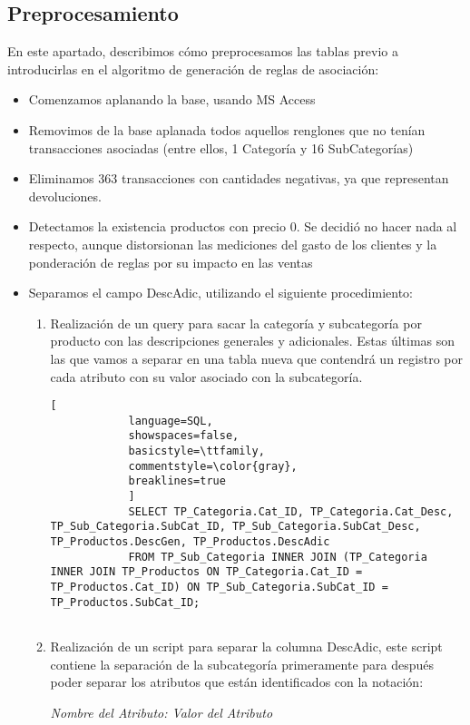 \documentclass[]{article}
\begin{document}
	\subsection{Preprocesamiento}
	En este apartado, describimos cómo preprocesamos las tablas previo a introducirlas en el algoritmo de generación de reglas de asociación:
	\begin{itemize}
		\item Comenzamos aplanando la base, usando MS Access
		\item Removimos de la base aplanada todos aquellos renglones que no tenían transacciones asociadas (entre ellos, 1 Categoría y 16 SubCategorías)
		\item Eliminamos 363 transacciones con cantidades negativas, ya que representan devoluciones.
		\item Detectamos la existencia productos con precio 0. Se decidió no hacer nada al respecto, aunque distorsionan las mediciones del gasto de los clientes y la ponderación de reglas por su impacto en las ventas
		\item Separamos el campo DescAdic, utilizando el siguiente procedimiento:
		\begin{enumerate}
			\item Realización de un query para sacar la categoría y subcategoría por producto con las descripciones generales y adicionales.  Estas últimas son las que vamos a separar en una tabla nueva que contendrá un registro por cada atributo con su valor asociado con la subcategoría.
			
			\begin{lstlisting}[
			language=SQL,
			showspaces=false,
			basicstyle=\ttfamily,
			commentstyle=\color{gray},
			breaklines=true
			]
			SELECT TP_Categoria.Cat_ID, TP_Categoria.Cat_Desc, TP_Sub_Categoria.SubCat_ID, TP_Sub_Categoria.SubCat_Desc, TP_Productos.DescGen, TP_Productos.DescAdic
			FROM TP_Sub_Categoria INNER JOIN (TP_Categoria INNER JOIN TP_Productos ON TP_Categoria.Cat_ID = TP_Productos.Cat_ID) ON TP_Sub_Categoria.SubCat_ID = TP_Productos.SubCat_ID;
			
			\end{lstlisting}
			
			\item Realización de un script para separar la columna DescAdic, este script contiene la separación de la subcategoría primeramente para después poder separar los atributos que están identificados con la notación:
			\begin{center}
				\textit{Nombre del Atributo: Valor del Atributo}		
			\end{center}
			

\end{enumerate}
\end{itemize}
\end{document}

